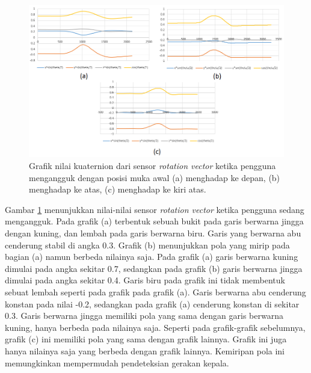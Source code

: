 \documentclass[a4paper,twoside]{article}
\begin{document}
\begin{enumerate}
\begin{figure}[htbp]
\centering
\includegraphics[scale=0.6]{Gambar/grafik-sensor-rot-vector-mengangguk.png}
\caption{Grafik nilai kuaternion dari sensor \textit{rotation vector} ketika pengguna mengangguk dengan posisi muka awal (a) menghadap ke depan, (b) menghadap ke atas, (c) menghadap ke kiri atas.} 
\label{fig:grafik-sensor-rot-vector-mengangguk}
\end{figure}

Gambar \ref{fig:grafik-sensor-rot-vector-mengangguk} menunjukkan nilai-nilai sensor \textit{rotation vector} ketika pengguna sedang mengangguk. Pada grafik (a) terbentuk sebuah bukit pada garis berwarna jingga dengan kuning, dan lembah pada garis berwarna biru. Garis yang berwarna abu cenderung stabil di angka 0.3. Grafik (b) menunjukkan pola yang mirip pada bagian (a) namun berbeda nilainya saja. Pada grafik (a) garis berwarna kuning dimulai pada angka sekitar 0.7, sedangkan pada grafik (b) garis berwarna jingga dimulai pada angka sekitar 0.4. Garis biru pada grafik ini tidak membentuk sebuat lembah seperti  pada grafik pada grafik (a). Garis berwarna abu cenderung konstan pada nilai -0.2, sedangkan pada grafik (a) cenderung konstan di sekitar 0.3. Garis berwarna jingga memiliki pola yang sama dengan garis berwarna kuning, hanya berbeda pada nilainya saja. Seperti pada grafik-grafik sebelumnya, grafik (c) ini memiliki pola yang sama dengan grafik lainnya. Grafik ini juga hanya nilainya saja yang berbeda dengan grafik lainnya. Kemiripan pola ini memungkinkan mempermudah pendeteksian gerakan kepala. 


\end{enumerate}
\end{document}
